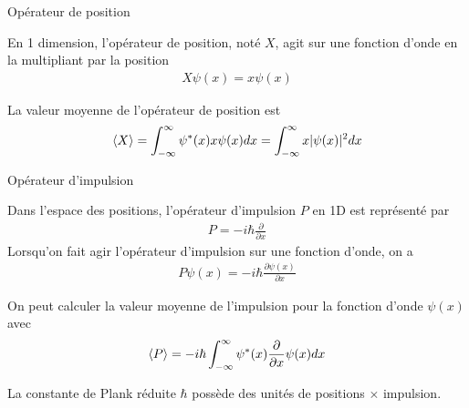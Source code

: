 \documentclass[xcolor=svgnames,t,aspectratio=169,handout]{uqtrcours}
\begin{document}
\begin{frame}{Opérateur de position}

En 1 dimension, 
  l'opérateur de position, noté $X$,
  agit sur une fonction d'onde
  en la multipliant par la position
%
\begin{align}
  X \psi(x) = x \psi(x) 
\end{align}

La valeur moyenne de l'opérateur de position est
\begin{align}
  \braket{X}
  =
  \int_{-\infty}^{\infty}
  \psi^*(x)
  x
  \psi(x)
  dx
  =
  \int_{-\infty}^{\infty}
  x
  \vert \psi(x) \vert^2
  dx
\end{align}

\end{frame}



\begin{frame}{Opérateur d'impulsion}

Dans l'espace des positions,
  l'opérateur d'impulsion $P$ en 1D
  est représenté par
\begin{align}
  P  = -i\hbar \frac{\partial}{\partial x}
\end{align}
%
Lorsqu'on fait agir l'opérateur d'impulsion sur une fonction d'onde, on a
\begin{align}
  P \psi(x)
  =
  -i\hbar \frac{\partial \psi(x)}{\partial x}
\end{align}

On peut calculer la valeur moyenne de l'impulsion
  pour la fonction d'onde $\psi(x)$ avec
\begin{align}
  \braket{P}
  =
  -i\hbar
  \int_{-\infty}^{\infty}
  \psi^*(x)
  \frac{\partial}{\partial x}
  \psi(x)
  dx
\end{align}

La constante de Plank réduite $\hbar$
  possède des unités de positions $\times$ impulsion.


\end{frame}
\end{document}
